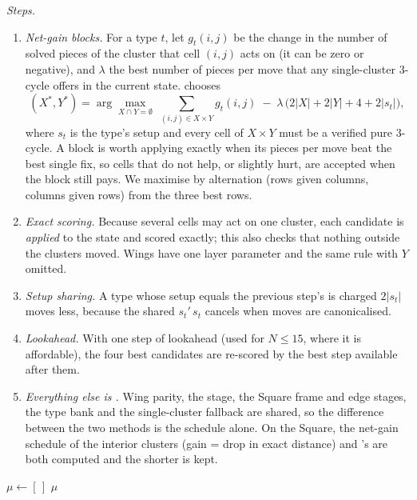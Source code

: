 \emph{Steps.}
\begin{enumerate}
\item \emph{Net-gain blocks.} For a type $t$, let $g_t(i,j)$ be the change in the number of solved pieces of the cluster that
  cell $(i,j)$ acts on (it can be zero or negative), and $\lambda$ the best number of pieces per move that any
  single-cluster 3-cycle offers in the current state. \FiveC chooses
  \begin{equation}
  (X^\ast,Y^\ast)=\arg\max_{X\cap Y=\emptyset}\;\sum_{(i,j)\in X\times Y} g_t(i,j)\;-\;\lambda\,\bigl(2|X|+2|Y|+4+2|s_t|\bigr),
  \label{eq:5c}
  \end{equation}
  where $s_t$ is the type's setup and every cell of $X\times Y$ must be a verified pure 3-cycle. A block is worth applying
  exactly when its pieces per move beat the best single fix, so cells that do not help, or slightly hurt, are accepted when
  the block still pays. We maximise by alternation (rows given columns, columns given rows) from the three best rows.
\item \emph{Exact scoring.} Because several cells may act on one cluster, each candidate is \emph{applied} to the state and
  scored exactly; this also checks that nothing outside the clusters moved. Wings have one layer parameter and the same rule
  with $Y$ omitted.
\item \emph{Setup sharing.} A type whose setup equals the previous step's is charged $2|s_t|$ moves less, because the shared
  $s_t'\,s_t$ cancels when moves are canonicalised.
\item \emph{Lookahead.} With one step of lookahead (used for $N\le15$, where it is affordable), the four best candidates are
  re-scored by the best step available after them.
\item \emph{Everything else is \Mthree.} Wing parity, the  stage, the Square frame and edge stages, the type bank and
  the single-cluster fallback are shared, so the difference between the two methods is the schedule alone. On the Square,
  the net-gain schedule of the interior clusters (gain = drop in exact distance) and \Mthree's are both computed and the
  shorter is kept.
\end{enumerate}

\begin{algorithm}[t]
\caption{\FiveC schedule for one family of clusters (centers or wings)}
\label{alg:5c}
\small
{}
$\mu\leftarrow[\,]$\;
\Return $\mu$\;
\end{algorithm}

